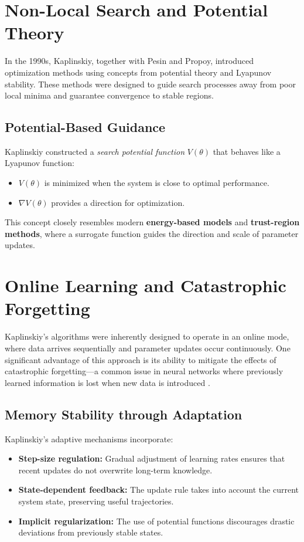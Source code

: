 \documentclass[12pt]{article}
\begin{document}
\section{Non-Local Search and Potential Theory}
In the 1990s, Kaplinskiy, together with Pesin and Propoy, introduced optimization methods using concepts from potential theory and Lyapunov stability. These methods were designed to guide search processes away from poor local minima and guarantee convergence to stable regions.

\subsection*{Potential-Based Guidance}
Kaplinskiy constructed a \emph{search potential function} $V(\theta)$ that behaves like a Lyapunov function:
\begin{itemize}[noitemsep]
\item $V(\theta)$ is minimized when the system is close to optimal performance.
\item $\nabla V(\theta)$ provides a direction for optimization.
\end{itemize}
This concept closely resembles modern \textbf{energy-based models} and \textbf{trust-region methods}, where a surrogate function guides the direction and scale of parameter updates.

\section{Online Learning and Catastrophic Forgetting}
Kaplinskiy's algorithms were inherently designed to operate in an online mode, where data arrives sequentially and parameter updates occur continuously. One significant advantage of this approach is its ability to mitigate the effects of catastrophic forgetting—a common issue in neural networks where previously learned information is lost when new data is introduced \cite{VSK}.

\subsection*{Memory Stability through Adaptation}
Kaplinskiy's adaptive mechanisms incorporate:
\begin{itemize}
\item \textbf{Step-size regulation:} Gradual adjustment of learning rates ensures that recent updates do not overwrite long-term knowledge.
\item \textbf{State-dependent feedback:} The update rule takes into account the current system state, preserving useful trajectories.
\item \textbf{Implicit regularization:} The use of potential functions discourages drastic deviations from previously stable states.
\end{itemize}
\end{document}
